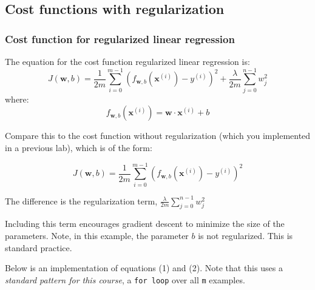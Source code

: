 \documentclass[11pt]{article}
\begin{document}
    \hypertarget{cost-functions-with-regularization}{%
\subsection{Cost functions with
regularization}\label{cost-functions-with-regularization}}

\hypertarget{cost-function-for-regularized-linear-regression}{%
\subsubsection{Cost function for regularized linear
regression}\label{cost-function-for-regularized-linear-regression}}

The equation for the cost function regularized linear regression is:
\[J(\mathbf{w},b) = \frac{1}{2m} \sum\limits_{i = 0}^{m-1} (f_{\mathbf{w},b}(\mathbf{x}^{(i)}) - y^{(i)})^2  + \frac{\lambda}{2m}  \sum_{j=0}^{n-1} w_j^2 \tag{1}\]
where:
\[ f_{\mathbf{w},b}(\mathbf{x}^{(i)}) = \mathbf{w} \cdot \mathbf{x}^{(i)} + b  \tag{2} \]

Compare this to the cost function without regularization (which you
implemented in a previous lab), which is of the form:

\[J(\mathbf{w},b) = \frac{1}{2m} \sum\limits_{i = 0}^{m-1} (f_{\mathbf{w},b}(\mathbf{x}^{(i)}) - y^{(i)})^2 \]

The difference is the regularization term, {
\(\frac{\lambda}{2m} \sum_{j=0}^{n-1} w_j^2\) }

Including this term encourages gradient descent to minimize the size of
the parameters. Note, in this example, the parameter \(b\) is not
regularized. This is standard practice.

Below is an implementation of equations (1) and (2). Note that this uses
a \emph{standard pattern for this course}, a \texttt{for\ loop} over all
\texttt{m} examples.
\end{document}
